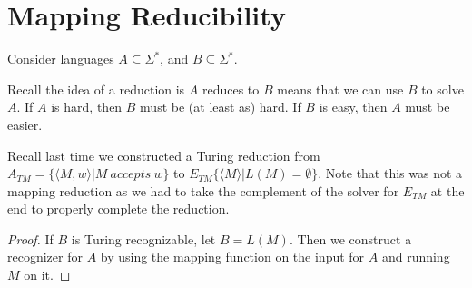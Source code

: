 



\section*{Mapping Reducibility}

Consider languages $A\subseteq\Sigma^*$, and $B\subseteq\Sigma^*$.  

Recall the idea of a reduction is $A$ reduces to $B$ means that we can use $B$ to solve $A$.  If $A$ is hard, then $B$ must be (at least as) hard.  If $B$ is easy, then $A$ must be easier.









Recall last time we constructed a Turing reduction from $A_{TM} = \{\langle M,w\rangle | M \ accepts \ w\}$ to $E_{TM} \{\langle M \rangle|L(M)=\emptyset\}$.  Note that this was not a mapping reduction as we had to take the complement of the solver for $E_{TM}$ at the end to properly complete the reduction.



\begin{proof}
	If $B$ is Turing recognizable, let $B=L(M)$.  Then we construct a recognizer for $A$ by using the mapping function on the input for $A$ and running $M$ on it.
	
\end{proof}




